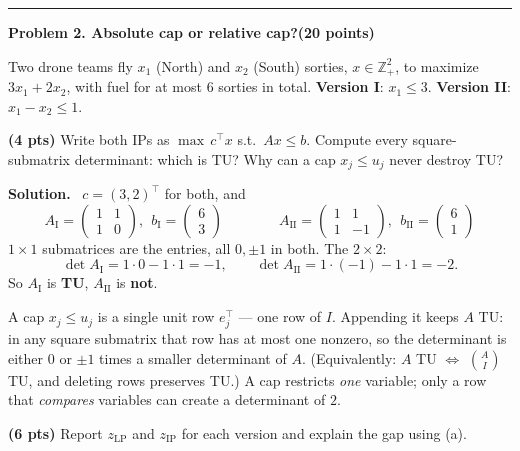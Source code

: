 \documentclass[10pt]{article}
\newcommand{\problem}[2]{%
  \par\bigskip
  {\color{ruleink}\rule{\textwidth}{1pt}}\par\nobreak\vspace{3pt}
  {\large\bfseries #2}\hfill{\normalsize\bfseries(#1 points)}\par\nobreak\vspace{4pt}}
\newenvironment{solution}
  {\par\smallskip\begingroup\color{solink}\textbf{Solution.}\ }
  {\endgroup\par}
\begin{document}
\problem{20}{Problem 2. Absolute cap or relative cap?}

Two drone teams fly $x_1$ (North) and $x_2$ (South) sorties, $x \in \mathbb{Z}^2_{+}$,
to maximize $3x_1 + 2x_2$, with fuel for at most $6$ sorties in total.
\textbf{Version I}: $x_1 \le 3$. \quad \textbf{Version II}: $x_1 - x_2 \le 1$.

\begin{parts}
\item \textbf{(4 pts)} Write both IPs as $\max\, c^{\top}x$ s.t.\ $Ax \le b$. Compute every
  square-submatrix determinant: which is TU? Why can a cap $x_j \le u_j$ never destroy TU?

\begin{solution}
$c = (3,2)^{\top}$ for both, and
\[
  A_{\mathrm{I}} = \begin{pmatrix} 1 & 1 \\ 1 & 0 \end{pmatrix}, \ \ b_{\mathrm{I}} = \begin{pmatrix} 6 \\ 3 \end{pmatrix}
  \qquad\qquad
  A_{\mathrm{II}} = \begin{pmatrix} 1 & 1 \\ 1 & -1 \end{pmatrix}, \ \ b_{\mathrm{II}} = \begin{pmatrix} 6 \\ 1 \end{pmatrix}
\]
$1\times1$ submatrices are the entries, all $0, \pm 1$ in both. The $2\times2$:
\[
  \det A_{\mathrm{I}} = 1\cdot 0 - 1 \cdot 1 = -1, \qquad
  \det A_{\mathrm{II}} = 1\cdot(-1) - 1 \cdot 1 = -2 .
\]
So $A_{\mathrm{I}}$ is \textbf{TU}, $A_{\mathrm{II}}$ is \textbf{not}.

A cap $x_j \le u_j$ is a single unit row $e_j^{\top}$ --- one row of $I$. Appending it keeps
$A$ TU: in any square submatrix that row has at most one nonzero, so the determinant is
either $0$ or $\pm 1$ times a smaller determinant of $A$. (Equivalently: $A$ TU $\iff$
$\binom{A}{I}$ TU, and deleting rows preserves TU.) A cap restricts \emph{one} variable;
only a row that \emph{compares} variables can create a determinant of $2$.
\end{solution}

\item \textbf{(6 pts)} Report $z_{\mathrm{LP}}$ and $z_{\mathrm{IP}}$ for each version and
  explain the gap using (a).


\end{parts}
\end{document}
